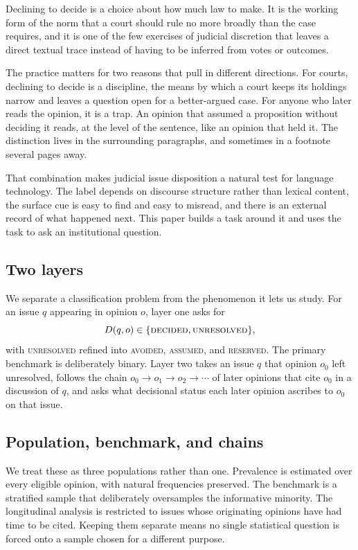 \documentclass[11pt]{article}
\begin{document}
Declining to decide is a choice about how much law to make. It is the working
form of the norm that a court should rule no more broadly than the case
requires, and it is one of the few exercises of judicial discretion that leaves
a direct textual trace instead of having to be inferred from votes or outcomes.

The practice matters for two reasons that pull in different directions. For
courts, declining to decide is a discipline, the means by which a court keeps its
holdings narrow and leaves a question open for a better-argued case. For anyone
who later reads the opinion, it is a trap. An opinion that assumed a proposition
without deciding it reads, at the level of the sentence, like an
opinion that held it. The distinction lives in the surrounding paragraphs, and
sometimes in a footnote several pages away.

That combination makes judicial issue disposition a natural test for language
technology. The label depends on discourse structure rather than lexical content,
the surface cue is easy to find and easy to misread, and there is an external
record of what happened next. This paper builds a task around it and uses the
task to ask an institutional question.

\subsection{Two layers} We separate a classification problem from the phenomenon
it lets us study. For an issue $q$ appearing in opinion $o$, layer one asks for
\begin{equation}
D(q,o) \in \{\textsc{decided}, \textsc{unresolved}\},
\end{equation}
with \textsc{unresolved} refined into \textsc{avoided}, \textsc{assumed}, and
\textsc{reserved}. The primary benchmark is deliberately binary. Layer two takes
an issue $q$ that opinion $o_0$ left unresolved, follows the chain
$o_0 \rightarrow o_1 \rightarrow o_2 \rightarrow \cdots$ of later opinions that
cite $o_0$ in a discussion of $q$, and asks what decisional status each later
opinion ascribes to $o_0$ on that issue.

\subsection{Population, benchmark, and chains} We treat these as three
populations rather than one. Prevalence is estimated over every eligible
opinion, with natural frequencies preserved. The benchmark is a stratified
sample that deliberately oversamples the informative minority. The longitudinal
analysis is restricted to issues whose originating opinions have had time to be
cited. Keeping them separate means no single statistical question is forced onto
a sample chosen for a different purpose.
\end{document}
